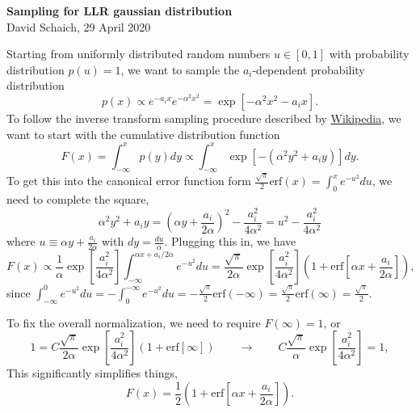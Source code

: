 \documentclass[12 pt]{article}
\newcommand{\al}{\ensuremath{\alpha} }
\newcommand{\lra}{\ensuremath{\longrightarrow} }
\newcommand{\erf}{\ensuremath{\mbox{erf}} }
\begin{document}
\setlength{\abovedisplayskip}{6 pt}
\setlength{\belowdisplayskip}{6 pt}
\vspace{-24 pt}
\begin{center} {\Large\textbf{Sampling for LLR gaussian distribution}} \\ David Schaich, 29 April 2020\end{center}
\vspace{-12 pt}

Starting from uniformly distributed random numbers $u \in [0, 1]$ with probability distribution $p(u) = 1$, we want to sample the $a_i$-dependent probability distribution
\begin{equation}
  p(x) \propto e^{-a_i x} e^{-\al^2 x^2} = \exp\left[-\al^2 x^2 - a_i x\right].
\end{equation}
To follow the inverse transform sampling procedure described by \href{https://en.wikipedia.org/wiki/Inverse_transform_sampling}{Wikipedia}, we want to start with the cumulative distribution function
\begin{equation}
  F(x) = \int_{-\infty}^x p(y) dy \propto \int_{-\infty}^x \exp\left[-(\al^2 y^2 + a_i y)\right] dy.
\end{equation}
To get this into the canonical error function form $\displaystyle \frac{\sqrt{\pi}}{2} \erf(x) = \int_0^x e^{-u^2} du$, we need to complete the square,
\begin{equation*}
  \al^2 y^2 + a_i y = \left(\al y + \frac{a_i}{2\al}\right)^2 - \frac{a_i^2}{4\al^2} = u^2 - \frac{a_i^2}{4\al^2}
\end{equation*}
where $\displaystyle u \equiv \al y + \frac{a_i}{2\al}$ with $\displaystyle dy = \frac{du}{\al}$.
Plugging this in, we have
\begin{equation}
  F(x) \propto \frac{1}{\al} \exp\left[\frac{a_i^2}{4\al^2}\right] \int_{-\infty}^{\al x + a_i / 2\al} e^{-u^2} du = \frac{\sqrt{\pi}}{2\al} \exp\left[\frac{a_i^2}{4\al^2}\right] \left(1 + \erf\left[\al x + \frac{a_i}{2\al}\right]\right),
\end{equation}
since $\displaystyle \int_{-\infty}^0 e^{-u^2} du = -\int_0^{-\infty} e^{-u^2} du = -\frac{\sqrt{\pi}}{2} \erf(-\infty) = \frac{\sqrt{\pi}}{2} \erf(\infty) = \frac{\sqrt{\pi}}{2}$.

To fix the overall normalization, we need to require $F(\infty) = 1$, or
\begin{equation*}
  1 = C \frac{\sqrt{\pi}}{2\al} \exp\left[\frac{a_i^2}{4\al^2}\right] \left(1 + \erf\left[\infty\right]\right) \qquad \lra \qquad C \frac{\sqrt{\pi}}{\al} \exp\left[\frac{a_i^2}{4\al^2}\right] = 1,
\end{equation*}
This significantly simplifies things,
\begin{equation}
  F(x) = \frac{1}{2} \left(1 + \erf\left[\al x + \frac{a_i}{2\al}\right]\right).
\end{equation}
\end{document}
